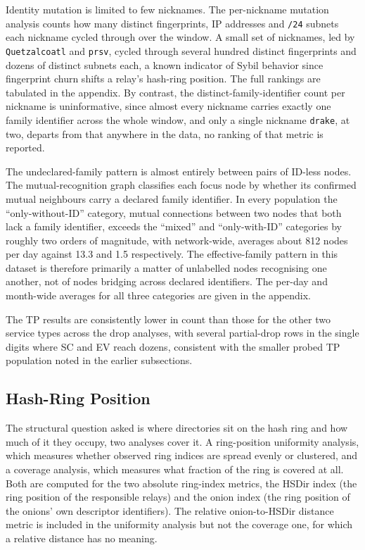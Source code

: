 \documentclass[conference]{IEEEtran}
\begin{document}
Identity mutation is limited to few nicknames. The per-nickname mutation analysis counts how many distinct fingerprints, IP addresses and 
\texttt{/24} subnets each nickname cycled through over the window. A small set of nicknames, led by \texttt{Quetzalcoatl} and \texttt{prsv}, cycled 
through several hundred distinct fingerprints and dozens of distinct subnets each, a known indicator of Sybil behavior since fingerprint churn shifts a relay's 
hash-ring position. The full rankings are tabulated in the appendix. By contrast, the distinct-family-identifier count per nickname is uninformative, since 
almost every nickname carries exactly one family identifier across the whole window, and only a single nickname \texttt{drake}, at two, departs 
from that anywhere in the data, no ranking of that metric is reported.
 
The undeclared-family pattern is almost entirely between pairs of ID-less nodes. The mutual-recognition graph classifies each focus node by whether its 
confirmed mutual neighbours carry a declared family identifier. In every population the ``only-without-ID'' category, mutual connections between 
two nodes that both lack a family identifier, exceeds the ``mixed'' and ``only-with-ID'' categories by roughly two orders of magnitude, with network-wide, 
averages about 812 nodes per day against 13.3 and 1.5 respectively. The effective-family pattern in this dataset is therefore primarily a 
matter of unlabelled nodes recognising one another, not of nodes bridging across declared identifiers. The per-day and month-wide averages for all 
three categories are given in the appendix.
 
The TP results are consistently lower in count than those for the other two service types across the drop analyses, with 
several partial-drop rows in the single digits where SC and EV reach dozens, consistent with the smaller probed TP population noted in the earlier 
subsections.

\subsection{Hash-Ring Position}
 
The structural question asked is where directories sit on the hash ring and how much of it they occupy, two analyses cover it. A 
ring-position uniformity analysis, which measures whether observed ring indices are spread evenly or clustered, and a coverage analysis, which measures 
what fraction of the ring is covered at all. Both are computed for the two absolute ring-index metrics, the HSDir index (the ring position of the 
responsible relays) and the onion index (the ring position of the onions' own descriptor identifiers). The relative onion-to-HSDir distance 
metric is included in the uniformity analysis but not the coverage one, for which a relative distance has no meaning.
 
\end{document}

